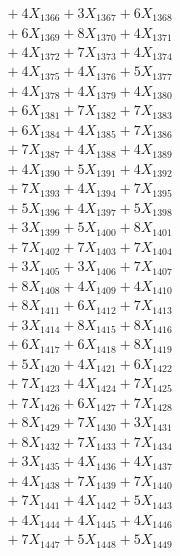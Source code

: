 \documentclass[a4paper,10pt]{article}
\begin{document}
{\begin{align}
&\;  + 4 X_{1366} + 3 X_{1367} + 6 X_{1368} \\[0.3ex]
&\;  + 6 X_{1369} + 8 X_{1370} + 4 X_{1371} \\[0.3ex]
&\;  + 4 X_{1372} + 7 X_{1373} + 4 X_{1374} \\[0.3ex]
&\;  + 4 X_{1375} + 4 X_{1376} + 5 X_{1377} \\[0.3ex]
&\;  + 4 X_{1378} + 4 X_{1379} + 4 X_{1380} \\[0.3ex]
&\;  + 6 X_{1381} + 7 X_{1382} + 7 X_{1383} \\[0.3ex]
&\;  + 6 X_{1384} + 4 X_{1385} + 7 X_{1386} \\[0.3ex]
&\;  + 7 X_{1387} + 4 X_{1388} + 4 X_{1389} \\[0.5ex]\allowbreak
&\;  + 4 X_{1390} + 5 X_{1391} + 4 X_{1392} \\[0.3ex]
&\;  + 7 X_{1393} + 4 X_{1394} + 7 X_{1395} \\[0.3ex]
&\;  + 5 X_{1396} + 4 X_{1397} + 5 X_{1398} \\[0.3ex]
&\;  + 3 X_{1399} + 5 X_{1400} + 8 X_{1401} \\[0.3ex]
&\;  + 7 X_{1402} + 7 X_{1403} + 7 X_{1404} \\[0.3ex]
&\;  + 3 X_{1405} + 3 X_{1406} + 7 X_{1407} \\[0.3ex]
&\;  + 8 X_{1408} + 4 X_{1409} + 4 X_{1410} \\[0.3ex]
&\;  + 8 X_{1411} + 6 X_{1412} + 7 X_{1413} \\[0.3ex]
&\;  + 3 X_{1414} + 8 X_{1415} + 8 X_{1416} \\[0.3ex]
&\;  + 6 X_{1417} + 6 X_{1418} + 8 X_{1419} \\[0.5ex]\allowbreak
&\;  + 5 X_{1420} + 4 X_{1421} + 6 X_{1422} \\[0.3ex]
&\;  + 7 X_{1423} + 4 X_{1424} + 7 X_{1425} \\[0.3ex]
&\;  + 7 X_{1426} + 6 X_{1427} + 7 X_{1428} \\[0.3ex]
&\;  + 8 X_{1429} + 7 X_{1430} + 3 X_{1431} \\[0.3ex]
&\;  + 8 X_{1432} + 7 X_{1433} + 7 X_{1434} \\[0.3ex]
&\;  + 3 X_{1435} + 4 X_{1436} + 4 X_{1437} \\[0.3ex]
&\;  + 4 X_{1438} + 7 X_{1439} + 7 X_{1440} \\[0.3ex]
&\;  + 7 X_{1441} + 4 X_{1442} + 5 X_{1443} \\[0.3ex]
&\;  + 4 X_{1444} + 4 X_{1445} + 4 X_{1446} \\[0.3ex]
&\;  + 7 X_{1447} + 5 X_{1448} + 5 X_{1449} \\[0.5ex]\allowbreak

\end{align}}
\end{document}
